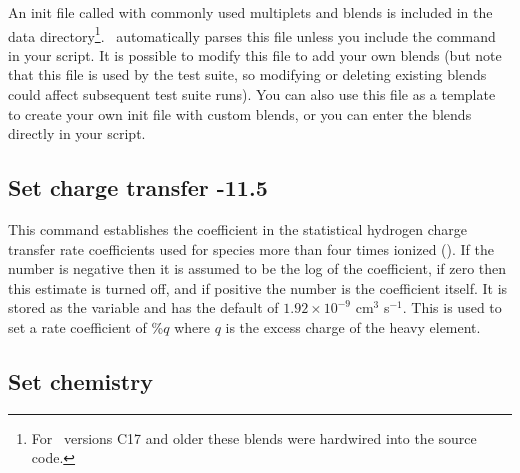 An init file called  with commonly used multiplets and
blends is included in the data directory\footnote{For \Cloudy\ versions C17 and
  older these blends were hardwired into the source code.}. \Cloudy\ automatically
parses this file unless you include the  command in your
script. It is possible to modify this file to add your own blends (but note that
this file is used by the test suite, so modifying or deleting existing blends
could affect subsequent test suite runs). You can also use this file as a
template to create your own init file with custom blends, or you can enter the
blends directly in your script.

\subsection{Set charge transfer -11.5}

This command establishes the coefficient in the statistical hydrogen
charge transfer rate coefficients used for species more than four times
ionized (\citealp{Ferland1997}).
If the number is negative then it is assumed
to be the log of the coefficient,
if zero then this estimate is turned off,
and if positive the number is the coefficient itself.
It is stored as the
variable  and has the default of
$1.92\times 10^{-9}$ cm$^3$ s$^{-1}$.
This is used to
set a rate coefficient of  \%$q$
where $q$ is the excess charge of the heavy element.

\subsection{Set chemistry}

